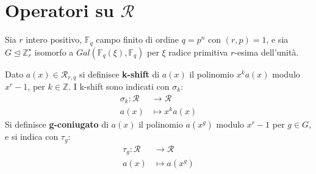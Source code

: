 \section{Operatori su $\mathcal{R}$}
Sia $r$ intero positivo, $\mathbb{F}_{q}$ campo finito di ordine $q=p^n$ con $(r,p)=1$, e sia $G \trianglelefteq \mathbb{Z}_{r}^{\star}$ isomorfo a $ Gal(\mathbb{F}_{q}(\xi), \mathbb{F}_{q})$ per $\xi$ radice primitiva $r$-esima dell'unità.
\begin{definizione}
   Dato $a(x) \in \mathcal{R}_{r,q}$ si definisce {\bf k-shift} di $a(x)$ il polinomio $x^{k}a(x)$ modulo $x^r - 1$, per $k \in \mathbb{Z}$.
   I k-shift sono indicati con $\sigma_{k}$:
   \begin{align*}
     \sigma_{k} : \mathcal{R} &\longrightarrow  \mathcal{R}  \\
                         a(x) &\longmapsto x^k a(x)
   \end{align*}
   Si definisce {\bf g-coniugato} di $a(x)$ il polinomio $a(x^g)$ modulo $x^r-1$ per $g \in G$, e si indica con $\tau_{g}$:
   \begin{align*}
     \tau_{g} : \mathcal{R} &\longrightarrow  \mathcal{R}  \\
                         a(x) &\longmapsto a(x^g)
   \end{align*}
\end{definizione}

